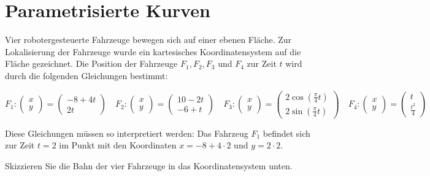 \section{Parametrisierte Kurven}
Vier robotergesteuerte Fahrzeuge bewegen sich auf einer ebenen Fläche. Zur Lokalisierung der Fahrzeuge wurde ein kartesisches Koordinatensystem auf die Fläche gezeichnet. Die Position der Fahrzeuge \(F_1, F_2, F_3\) und \(F_4\) zur Zeit \(t\) wird durch die folgenden Gleichungen bestimmt:

\[
    F_1 : \begin{pmatrix}
        x \\y
    \end{pmatrix}
    =
    \begin{pmatrix}
        -8 + 4t \\
        2t
    \end{pmatrix}
    \quad
    F_2 : \begin{pmatrix}
        x \\y
    \end{pmatrix}
    = \begin{pmatrix}
        10 - 2t \\
        -6 + t
    \end{pmatrix}
    \quad
    F_3 : \begin{pmatrix}
        x \\y
    \end{pmatrix}
    =
    \begin{pmatrix}
        2 \cos\left(\frac{\pi}{4}t\right) \\
        2 \sin\left(\frac{\pi}{4}t\right)
    \end{pmatrix}
    \quad
    F_4 : \begin{pmatrix}
        x \\y
    \end{pmatrix}
    = \begin{pmatrix}
        t \\
        \frac{t^2}{4}
    \end{pmatrix}
\]

Diese Gleichungen müssen so interpretiert werden: Das Fahrzeug \(F_1\) befindet sich zur Zeit \(t=2\) im Punkt mit den Koordinaten \(x = -8 + 4 \cdot 2\) und \(y = 2 \cdot 2\).

Skizzieren Sie die Bahn der vier Fahrzeuge in das Koordinatensystem unten.

